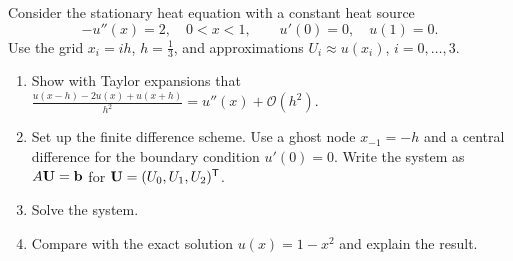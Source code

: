 Consider the stationary heat equation with a constant heat source
\[
-u''(x)=2,\quad 0<x<1,\qquad u'(0)=0,\quad u(1)=0.
\]
Use the grid $x_i=ih$, $h=\frac13$, and approximations $U_i\approx u(x_i)$, $i=0,\dots,3$.
\begin{enumerate}
\item Show with Taylor expansions that $\frac{u(x-h)-2u(x)+u(x+h)}{h^2}=u''(x)+\mathcal O(h^2)$.
\item Set up the finite difference scheme. Use a ghost node $x_{-1}=-h$ and a central difference for the boundary condition $u'(0)=0$. Write the system as $A\mathbf{U}=\mathbf{b}$ for $\mathbf{U}=(U_0,U_1,U_2)^{\mathsf{T}}$.
\item Solve the system.
\item Compare with the exact solution $u(x)=1-x^2$ and explain the result.
\end{enumerate}

